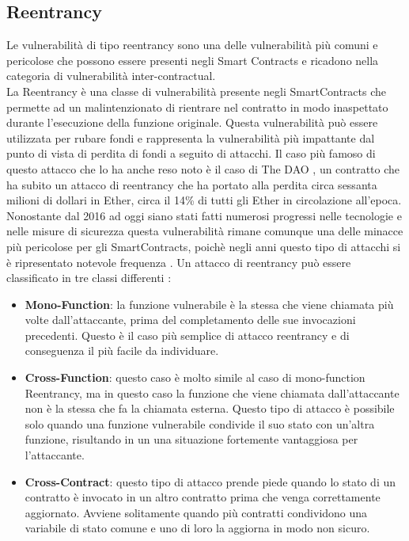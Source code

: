 \documentclass[../../Thesis.tex]{subfiles}
\begin{document}
\subsection{Reentrancy}
Le vulnerabilità di tipo reentrancy sono una delle vulnerabilità più comuni e pericolose che possono essere presenti negli Smart Contracts e ricadono nella categoria di vulnerabilità inter-contractual.\\
La Reentrancy è una classe di vulnerabilità presente negli SmartContracts che permette ad un malintenzionato di rientrare nel contratto in modo inaspettato durante l'esecuzione della funzione originale. Questa vulnerabilità può essere utilizzata per rubare fondi e rappresenta la vulnerabilità più impattante dal punto di vista di perdita di fondi a seguito di attacchi.
Il caso più famoso di questo attacco che lo ha anche reso noto è il caso di The DAO \cite{DAO}, un contratto che ha subito un attacco di reentrancy che ha portato alla perdita circa sessanta milioni di dollari in Ether, circa il 14\% di tutti gli Ether in circolazione all'epoca. Nonostante dal 2016 ad oggi siano stati fatti numerosi progressi nelle tecnologie e nelle misure di sicurezza questa vulnerabilità rimane comunque una delle minacce più pericolose per gli SmartContracts, poichè negli anni questo tipo di attacchi si è ripresentato notevole frequenza \cite{reentrancy-historical}. Un attacco di reentrancy può essere classificato in tre classi differenti \cite{Zeus, Vulnerabilities}:
\begin{itemize}
    \item \textbf{Mono-Function}: la funzione vulnerabile è la stessa che viene chiamata più volte dall'attaccante, prima del completamento delle sue invocazioni precedenti. Questo è il caso più semplice di attacco reentrancy e di conseguenza il più facile da individuare.
    \item \textbf{Cross-Function}: questo caso è molto simile al caso di mono-function Reentrancy, ma in questo caso la funzione che viene chiamata dall'attaccante non è la stessa che fa la chiamata esterna. Questo tipo di attacco è possibile solo quando una funzione vulnerabile condivide il suo stato con un'altra funzione, risultando in un una situazione fortemente vantaggiosa per l'attaccante. 
    \item \textbf{Cross-Contract}: questo tipo di attacco prende piede quando lo stato di un contratto è invocato in un altro contratto prima che venga correttamente aggiornato. Avviene solitamente quando più contratti condividono una variabile di stato comune e uno di loro la aggiorna in modo non sicuro. 
\end{itemize}
\end{document}
